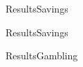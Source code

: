 \documentclass[aspectratio=169]{beamer}
\begin{document}
\begin{frame}{Results}{Savings}

	

\end{frame}

\begin{frame}{Results}{Savings}

	

\end{frame}

\begin{frame}{Results}{Gambling}

	

\end{frame}
\end{document}
